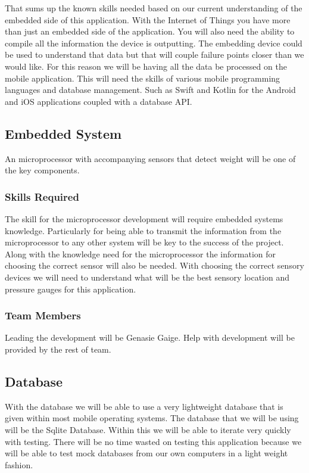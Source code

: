 \documentclass{article}
\begin{document}
That sums up the known skills needed based on our current understanding of the embedded side of this application. 
With the Internet of Things you have more than just an embedded side of the application. 
You will also need the ability to compile all the information the device is outputting. 
The embedding device could be used to understand that data but that will couple failure points closer than we would like.
For this reason we will be having all the data be processed on the mobile application.
This will need the skills of various mobile programming languages and database management.
Such as Swift and Kotlin for the Android and iOS applications coupled with a database API.

\subsection{Embedded System}
An microprocessor with accompanying sensors that detect weight will be one of the key components. 
\subsubsection{Skills Required}
The skill for the microprocessor development will require embedded systems knowledge.
Particularly for being able to transmit the information from the microprocessor to any other system will be key to the success of the project.
Along with the knowledge need for the microprocessor the information for choosing the correct sensor will also be needed.
With choosing the correct sensory devices we will need to understand what will be the best sensory location and pressure gauges for this application.
\subsubsection{Team Members}
Leading the development will be Genasie Gaige.
Help with development will be provided by the rest of team.


\subsection{Database}

With the database we will be able to use a very lightweight database that is given within most mobile operating systems. 
The database that we will be using will be the Sqlite Database. 
Within this we will be able to iterate very quickly with testing.
There will be no time wasted on testing this application because we will be able to test mock databases from our own computers in a light weight fashion.
\end{document}

